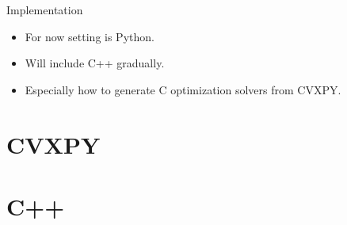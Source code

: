 \begin{chapter}{Implementation}

    \begin{itemize}
        \item For now setting is Python.
        \item Will include C++ gradually.
        \item Especially how to generate C optimization solvers from CVXPY.
    \end{itemize}

    \section{CVXPY}

    \section{C++}






\end{chapter}
